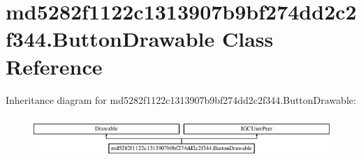 \hypertarget{classmd5282f1122c1313907b9bf274dd2c2f344_1_1ButtonDrawable}{}\section{md5282f1122c1313907b9bf274dd2c2f344.\+Button\+Drawable Class Reference}
\label{classmd5282f1122c1313907b9bf274dd2c2f344_1_1ButtonDrawable}
Inheritance diagram for md5282f1122c1313907b9bf274dd2c2f344.\+Button\+Drawable\+:\begin{figure}[H]
\begin{center}
\leavevmode
\includegraphics[height=1.595442cm]{classmd5282f1122c1313907b9bf274dd2c2f344_1_1ButtonDrawable}
\end{center}
\end{figure}
